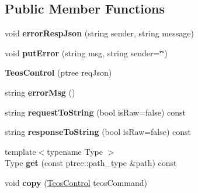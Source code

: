 \subsection*{Public Member Functions}
\begin{DoxyCompactItemize}
\item 
\mbox{\label{classteos_1_1_teos_control_abe614f0745845a707ec5c4e0457ebcc0}} 
void {\bfseries error\+Resp\+Json} (string sender, string message)
\item 
\mbox{\label{classteos_1_1_teos_control_ad5d500a5c6027ab6c4c9edee0affcf0c}} 
void {\bfseries put\+Error} (string msg, string sender=\char`\"{}\char`\"{})
\item 
\mbox{\label{classteos_1_1_teos_control_a52f86bb515d91acf6cfdccd3fc766187}} 
{\bfseries Teos\+Control} (ptree req\+Json)
\item 
\mbox{\label{classteos_1_1_teos_control_af23d4fb6c90c83e47bc6917b3add9da7}} 
string {\bfseries error\+Msg} ()
\item 
\mbox{\label{classteos_1_1_teos_control_af14d89eea741cfc345db34bd2ba75d0b}} 
string {\bfseries request\+To\+String} (bool is\+Raw=false) const
\item 
\mbox{\label{classteos_1_1_teos_control_a5a4f418dfe30ab50fb373e341b9974db}} 
string {\bfseries response\+To\+String} (bool is\+Raw=false) const
\item 
\mbox{\label{classteos_1_1_teos_control_ae5781470510c9bb90a3ef0917e72b1b8}} 
{\footnotesize template$<$typename Type $>$ }\\Type {\bfseries get} (const ptree\+::path\+\_\+type \&path) const
\item 
\mbox{\label{classteos_1_1_teos_control_aa318124d7a906e4b1391fae5ad50cfb0}} 
void {\bfseries copy} (\mbox{\hyperlink{classteos_1_1_teos_control}{Teos\+Control}} teos\+Command)
\end{DoxyCompactItemize}
